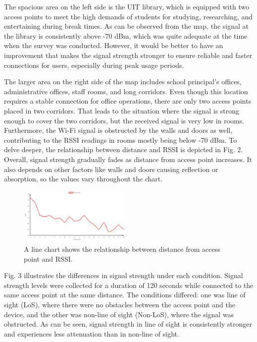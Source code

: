 \documentclass[conference]{IEEEtran}
\begin{document}
The spacious area on the left side is the UIT library, which is equipped with two access points to meet the high demands of students for studying, researching, and entertaining during break times. As can be observed from the map, the signal at the library is consistently above -70 dBm, which was quite adequate at the time when the survey was conducted. However, it would be better to have an improvement that makes the signal strength stronger to ensure reliable and faster connections for users, especially during peak usage periods.

The larger area on the right side of the map includes school principal’s offices, administrative offices, staff rooms, and long corridors. Even though this location requires a stable connection for office operations, there are only two access points placed in two corridors. That leads to the situation where the signal is strong enough to cover the two corridors, but the received signal is very low in rooms. Furthermore, the Wi-Fi signal is obstructed by the walls and doors as well, contributing to the RSSI readings in rooms mostly being below -70 dBm. To delve deeper, the relationship between distance and RSSI is depicted in Fig. 2. Overall, signal strength gradually fades as distance from access point increases. It also depends on other factors like walls and doors causing reflection or absorption, so the values vary throughout the chart.

\begin{figure}[htbp]
    \centering
    \includegraphics[width=0.48\textwidth]{rssi.png}
    \caption{A line chart shows the relationship between distance from access
point and RSSI.}
\end{figure}

Fig. 3 illustrates the differences in signal strength under each condition. Signal strength levels were collected for a duration of 120 seconds while connected to the same access point at the same distance. The conditions differed: one was line of sight (LoS), where there were no obstacles between the access point and the device, and the other was non-line of sight (Non-LoS), where the signal was obstructed. As can be seen, signal strength in line of sight is consistently stronger and experiences less attenuation than in non-line of sight.
\vspace{120}
\end{document}
